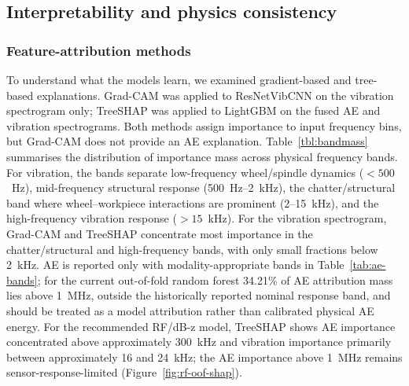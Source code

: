 \subsection{Interpretability and physics
consistency}\label{interpretability-and-physics-consistency}

\subsubsection{Feature-attribution methods}\label{sec:feature-attribution}

To understand what the models learn, we examined gradient-based and
tree-based explanations. Grad-CAM was applied to ResNetVibCNN on the
vibration spectrogram only; TreeSHAP was applied to LightGBM on the fused
AE and vibration spectrograms. Both methods assign importance to input
frequency bins, but Grad-CAM does not provide an AE explanation.
Table~\ref{tbl:bandmass} summarises the distribution of importance mass
across physical frequency bands. For vibration, the bands separate
low-frequency wheel/spindle dynamics (\(<500\)~Hz), mid-frequency
structural response (500~Hz--2~kHz), the chatter/structural band where
wheel--workpiece interactions are prominent (2--15~kHz), and the
high-frequency vibration response (\(>15\)~kHz). For the vibration spectrogram, Grad-CAM and TreeSHAP
concentrate most importance in the chatter/structural and high-frequency
bands, with only small fractions below 2~kHz. AE is reported only with
modality-appropriate bands in Table~\ref{tab:ae-bands}; for the current
out-of-fold random forest 34.21\% of AE attribution mass lies above 1~MHz, outside
the historically reported nominal response band, and should be treated as a model
attribution rather than calibrated physical AE energy. For the recommended RF/dB-z model, TreeSHAP shows AE
importance concentrated above approximately 300~kHz and vibration
importance primarily between approximately 16 and 24~kHz; the AE importance above 1~MHz remains
sensor-response-limited (Figure~\ref{fig:rf-oof-shap}).

